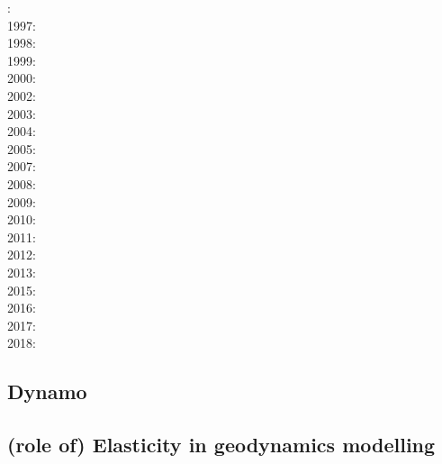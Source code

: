 {\scriptsize
{}: \cite{rehi73}\\
1997: \cite{bare97}\\
1998: \cite{cosh98}\\
1999: \cite{riwg99}\\
2000: \cite{coks00}\cite{brmm00}\cite{cacp00}\\
2002: \cite{cacp02}\cite{coks02}\cite{arbc02}\cite{gurw02}\\
2003: \cite{cock03}\\
2004: \cite{coks04}\\
2005: \cite{cacs05}\cite{coks05}\cite{cogo05a}\cite{cogo05b}\cite{cogo05c}\\
2007: \cite{coks07}\cite{feku07}\\
2008: \cite{kans08}\cite{mofh08}\cite{dole08}\cite{pepe08}\\
2009: \cite{coks09}\cite{cogo09}\cite{cogl09}\cite{ngpc09}\cite{shu09}\cite{codg08}\cite{cogw09}\\
2010: \cite{ngpc10}\cite{conp10}\cite{mofp10}\cite{kari10}\cite{cogs10}\\
2011: \cite{geor11}\cite{ngpc11}\\
2012: \cite{kauf12}\cite{ngpe12}\cite[chapt. 31]{lomw12}\\
2013: \cite{vyrc13}\cite{rhcv13}\\
2015: \cite{lelk15}\cite{kalc15}\\
2016: \cite{cock16}\cite{makc16}\\
2017: \cite{fewk17}\cite{iglo17}\cite{hepb17}\cite{chll17}\cite{sclu17a}\cite{sclu17b}
      \cite{sclu17c}\cite{zhan17}\\
2018: \cite{puth18}\cite{wogu18}\cite{fakr18}\cite{muwy18}
}

\subsection{Dynamo}

\cite{haha05}
\cite{erhh13}

\subsection{(role of) Elasticity in geodynamics modelling}

